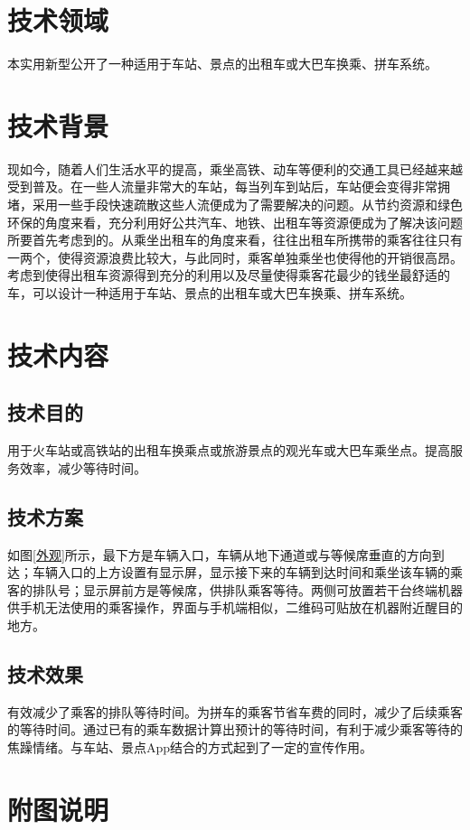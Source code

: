 \maketitle
\section{技术领域}
	本实用新型公开了一种适用于车站、景点的出租车或大巴车换乘、拼车系统。
\section{技术背景}
	现如今，随着人们生活水平的提高，乘坐高铁、动车等便利的交通工具已经越来越受到普及。在一些人流量非常大的车站，每当列车到站后，车站便会变得非常拥堵，采用一些手段快速疏散这些人流便成为了需要解决的问题。从节约资源和绿色环保的角度来看，充分利用好公共汽车、地铁、出租车等资源便成为了解决该问题所要首先考虑到的。从乘坐出租车的角度来看，往往出租车所携带的乘客往往只有一两个，使得资源浪费比较大，与此同时，乘客单独乘坐也使得他的开销很高昂。考虑到使得出租车资源得到充分的利用以及尽量使得乘客花最少的钱坐最舒适的车，可以设计一种适用于车站、景点的出租车或大巴车换乘、拼车系统。
\section{技术内容}
	\subsection{技术目的}
		用于火车站或高铁站的出租车换乘点或旅游景点的观光车或大巴车乘坐点。提高服务效率，减少等待时间。
	\subsection{技术方案}
		如图\ref{外观}所示，最下方是车辆入口，车辆从地下通道或与等候席垂直的方向到达；车辆入口的上方设置有显示屏，显示接下来的车辆到达时间和乘坐该车辆的乘客的排队号；显示屏前方是等候席，供排队乘客等待。两侧可放置若干台终端机器供手机无法使用的乘客操作，界面与手机端相似，二维码可贴放在机器附近醒目的地方。
	\subsection{技术效果}
		有效减少了乘客的排队等待时间。为拼车的乘客节省车费的同时，减少了后续乘客的等待时间。通过已有的乘车数据计算出预计的等待时间，有利于减少乘客等待的焦躁情绪。与车站、景点App结合的方式起到了一定的宣传作用。
\section{附图说明}
	\renewcommand\listfigurename{\tiny}
	\vspace{-2em}
	\listoffigures
